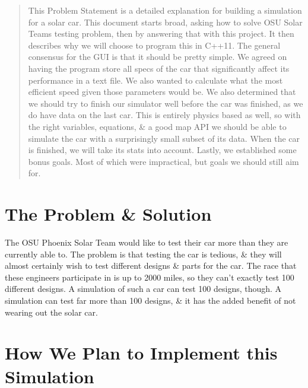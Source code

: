 \documentclass[onecolumn, draftclsnofoot,10pt, compsoc]{IEEEtran}
\begin{document}
\begin{singlespace}
\begin{titlepage}
\begin{abstract}
        	This Problem Statement is a detailed explanation for building a simulation for a solar car. This document starts broad, asking how to solve OSU Solar Teams testing problem, then by answering that with this project. It then describes why we will choose to program this in C++11. The general consensus for the GUI is that it should be pretty simple. We agreed on having the program store all specs of the car that significantly affect its performance in a text file. We also wanted to calculate what the most efficient speed given those parameters would be. We also determined that we should try to finish our simulator well before the car was finished, as we do have data on the last car. This is entirely physics based as well, so with the right variables, equations, \& a good map API we should be able to simulate the car with a surprisingly small subset of its data. When the car is finished, we will take its stats into account. Lastly, we established some bonus goals. Most of which were impractical, but goals we should still aim for.
        \end{abstract}
\end{titlepage}

\renewcommand{\familydefault}{\sfdefault}

\section{The Problem \& Solution}

The OSU Phoenix Solar Team would like to test their car more than they are currently able to. The problem is that testing the car is tedious, \& they will almost certainly wish to test different designs \& parts for the car. The race that these engineers participate in is up to 2000 miles, so they can’t exactly test 100 different designs. A simulation of such a car can test 100 designs, though. A simulation can test far more than 100 designs, \& it has the added benefit of not wearing out the solar car.

\section{How We Plan to Implement this Simulation}


\end{singlespace}
\end{document}
